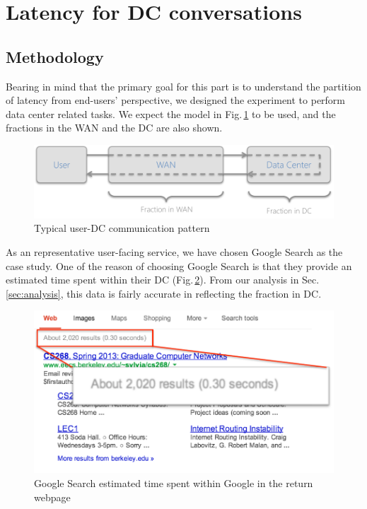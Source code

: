 \section{Latency for DC conversations}

\subsection{Methodology}

Bearing in mind that the primary goal for this part is to understand the partition of latency from end-users' perspective, we designed the experiment to perform data center related tasks. We expect the model in Fig.\,\ref{fig:DC_model} to be used, and the fractions in the WAN and the DC are also shown. 

\begin{figure}
  \centering
  \includegraphics[width=\linewidth]{../figs/DC_model.pdf}
  \caption{Typical user-DC communication pattern}
  \label{fig:DC_model}
\end{figure}

As an representative user-facing service, we have chosen Google Search as the case study. One of the reason of choosing Google Search is that they provide an estimated time spent within their DC (Fig.\,\ref{fig:google_time}). From our analysis in Sec.\,\ref{sec:analysis}, this data is fairly accurate in reflecting the fraction in DC. 

\begin{figure}[t]
  \centering
  \includegraphics[width=0.85\linewidth]{../figs/GoogleTime.pdf}
  \caption{Google Search estimated time spent within Google in the return webpage}
  \label{fig:google_time}
\end{figure}

